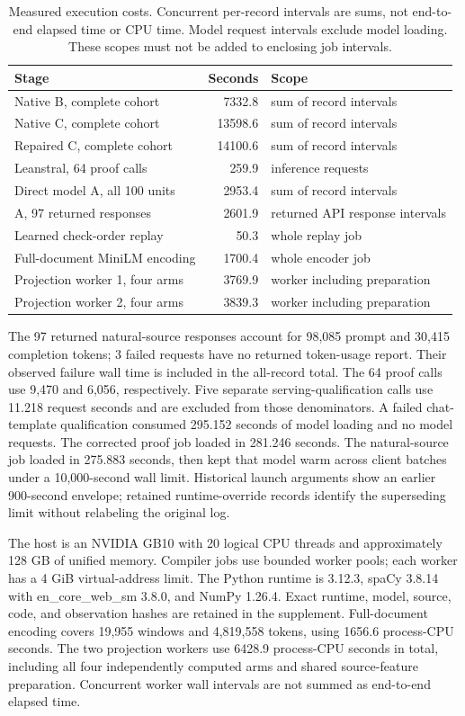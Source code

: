 \begin{table}[t]
\centering\small
\caption{Measured execution costs. Concurrent per-record intervals are sums, not end-to-end elapsed time or CPU time. Model request intervals exclude model loading. These scopes must not be added to enclosing job intervals.}
\label{tab:execution-costs}
\begin{tabular}{lrl}\toprule
Stage & Seconds & Scope\\\midrule
Native B, complete cohort & 7332.8 & sum of record intervals\\
Native C, complete cohort & 13598.6 & sum of record intervals\\
Repaired C, complete cohort & 14100.6 & sum of record intervals\\
Leanstral, 64 proof calls & 259.9 & inference requests\\
Direct model A, all 100 units & 2953.4 & sum of record intervals\\
A, 97 returned responses & 2601.9 & returned API response intervals\\
Learned check-order replay & 50.3 & whole replay job\\
Full-document MiniLM encoding & 1700.4 & whole encoder job\\
Projection worker 1, four arms & 3769.9 & worker including preparation\\
Projection worker 2, four arms & 3839.3 & worker including preparation\\
\bottomrule
\end{tabular}
\end{table}
The 97 returned natural-source responses account for 98,085 prompt and 30,415 completion tokens; 3 failed requests have no returned token-usage report. Their observed failure wall time is included in the all-record total. The 64 proof calls use 9,470 and 6,056, respectively. Five separate serving-qualification calls use 11.218 request seconds and are excluded from those denominators. A failed chat-template qualification consumed 295.152 seconds of model loading and no model requests. The corrected proof job loaded in 281.246 seconds. The natural-source job loaded in 275.883 seconds, then kept that model warm across client batches under a 10,000-second wall limit. Historical launch arguments show an earlier 900-second envelope; retained runtime-override records identify the superseding limit without relabeling the original log.

The host is an NVIDIA GB10 with 20 logical CPU threads and approximately 128 GB of unified memory. Compiler jobs use bounded worker pools; each worker has a 4 GiB virtual-address limit. The Python runtime is 3.12.3, spaCy 3.8.14 with en\_core\_web\_sm 3.8.0, and NumPy 1.26.4. Exact runtime, model, source, code, and observation hashes are retained in the supplement. Full-document encoding covers 19,955 windows and 4,819,558 tokens, using 1656.6 process-CPU seconds. The two projection workers use 6428.9 process-CPU seconds in total, including all four independently computed arms and shared source-feature preparation. Concurrent worker wall intervals are not summed as end-to-end elapsed time.
